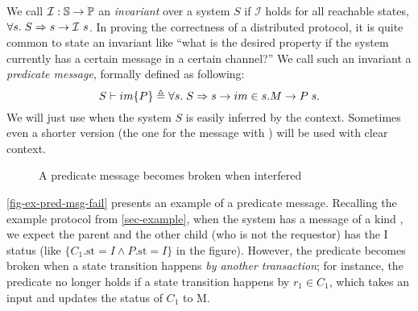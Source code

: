 \documentclass[sigplan,10pt,review,anonymous,screen]{acmart}\settopmatter{printfolios=true,printccs=false,printacmref=false}
\begin{document}
We call $\mathcal{I}: \mathbb{S}{} \to \mathbb{P}{}$ an \emph{invariant} over a system $S$ if $\mathcal{I}$ holds for all reachable states, \ie{} $\forall s.\; S \Rightarrow s \to \mathcal{I}\ s$.
In proving the correctness of a distributed protocol, it is quite common to state an invariant like ``what is the desired property if the system currently has a certain message in a certain channel?''
We call such an invariant a \emph{predicate message}, formally defined as following:
\begin{displaymath}
  S \vdash im\{P\} \triangleq \forall s.\; S \Rightarrow s \to im \in s.M \to P\; s.
\end{displaymath}
We will just use  when the system $S$ is easily inferred by the context.
Sometimes even a shorter version  (the one for the message with \msgid{}) will be used with clear context.

\begin{figure}[h]
  \centering
  \caption{A predicate message becomes broken when interfered}
  \vspace{-5pt}
  \label{fig-ex-pred-msg-fail}
\end{figure}

\autoref{fig-ex-pred-msg-fail} presents an example of a predicate message.
Recalling the example protocol from \autoref{sec-example}, when the system has a message of a kind , we expect the parent and the other child (who is not the requestor) has the I status (like {\color{myblue} $\{C_1.\textrm{st} = I \wedge P.\textrm{st} = I\}$} in the figure).
However, the predicate becomes broken when a state transition happens \emph{by another transaction}; for instance, the predicate no longer holds if a state transition happens by {\color{myred} $r_1 \in C_1$}, which takes an input {\color{myred} } and updates the status of $C_1$ to M.
\end{document}
